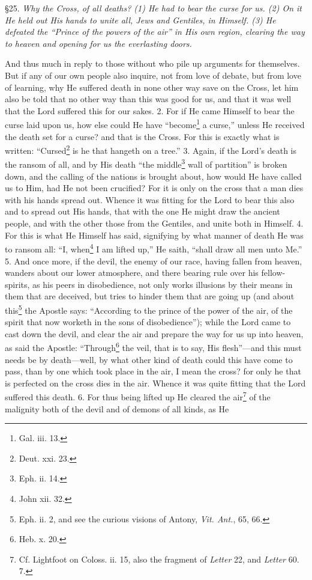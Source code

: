 
§25. \emph{Why the Cross, of all deaths? (1) He had to bear the curse for us. (2) On it He held out His hands to unite all, Jews and Gentiles, in Himself. (3) He defeated the “Prince of the powers of the air” in His own region, clearing the way to heaven and opening for us the everlasting doors.}

And thus much in reply to those without who pile up arguments for themselves. But if any of our own people also inquire, not from love of debate, but from love of learning, why He suffered death in none other way save on the Cross, let him also be told that no other way than this was good for us, and that it was well that the Lord suffered this for our sakes. 2. For if He came Himself to bear the curse laid upon us, how else could He have “become\footnote{Gal. iii. 13.} a curse,” unless He received the death set for a curse? and that is the Cross. For this is exactly what is written: “Cursed\footnote{Deut. xxi. 23.} is he that hangeth on a tree.” 3. Again, if the Lord’s death is the ransom of all, and by His death “the middle\footnote{Eph. ii. 14.} wall of partition” is broken down, and the calling of the nations is brought about, how would He have called us to Him, had He not been crucified? For it is only on the cross that a man dies with his hands spread out. Whence it was fitting for the Lord to bear this also and to spread out His hands, that with the one He might draw the ancient people, and with the other those from the Gentiles, and unite both in Himself. 4. For this is what He Himself has said, signifying by what manner of death He was to ransom all: “I, when\footnote{John xii. 32.} I am lifted up,” He saith, “shall draw all men unto Me.” 5. And once more, if the devil, the enemy of our race, having fallen from heaven, wanders about our lower atmosphere, and there bearing rule over his fellow-spirits, as his peers in disobedience, not only works illusions by their means in them that are deceived, but tries to hinder them that are going up (and about this\footnote{Eph. ii. 2, and see the curious visions of Antony, \emph{Vit. Ant.}, 65, 66.} the Apostle says: “According to the prince of the power of the air, of the spirit that now worketh in the sons of disobedience”); while the Lord came to cast down the devil, and clear the air and prepare the way for us up into heaven, as said the Apostle: “Through\footnote{Heb. x. 20.} the veil, that is to say, His flesh”—and this must needs be by death—well, by what other kind of death could this have come to pass, than by one which took place in the air, I mean the cross? for only he that is perfected on the cross dies in the air. Whence it was quite fitting that the Lord suffered this death. 6. For thus being lifted up He cleared the air\footnote{Cf. Lightfoot on Coloss. ii. 15, also the fragment of \emph{Letter} 22, and \emph{Letter} 60. 7.} of the malignity both of the devil and of demons of all kinds, as He 